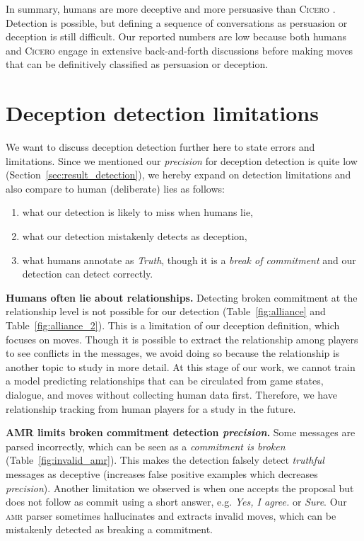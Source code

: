 \documentclass[oneside]{memoir}
\newcommand{\cicero}{\abr{Cicero} }
\newcommand{\abr}[1]{\textsc{#1}}
\begin{document}
In summary, humans are more deceptive and more persuasive than \cicero{}. 
%
Detection is possible, but defining a sequence of conversations as persuasion or deception is still difficult. 
%
Our reported numbers are low because both humans and \cicero{} engage in extensive back-and-forth discussions before making moves that can be definitively classified as persuasion or deception.


\section{Deception detection limitations}
\label{sec:deception_limitation}
We want to discuss deception detection further here to state errors and limitations. Since we mentioned our \textit{precision} for deception detection is quite low (Section~\ref{sec:result_detection}), we hereby expand on detection limitations and also compare to human (deliberate) lies as follows:
\begin{enumerate}
    \item what our detection is likely to miss when humans lie,
    \item what our detection mistakenly detects as deception,
    \item what humans annotate as \textit{Truth}, though it is a \textit{break of commitment} and our detection can detect correctly.
\end{enumerate}
%

\textbf{Humans often lie about relationships.} Detecting broken commitment at the relationship level is not possible for our detection (Table~\ref{fig:alliance} and Table~\ref{fig:alliance_2}).
%
This is a limitation of our deception definition, which focuses on moves.
%
Though it is possible to extract the relationship among players to see conflicts in the messages, we avoid doing so because the relationship is another topic to study in more detail.
%
At this stage of our work, we cannot train a model predicting relationships that can be circulated from game states, dialogue, and moves without collecting human data first.
%
Therefore, we have relationship tracking from human players for a study in the future.

\textbf{AMR limits broken commitment detection \textit{precision}.} Some messages are parsed incorrectly, which can be seen as a \textit{commitment is broken} (Table~\ref{fig:invalid_amr}). 
%
This makes the detection falsely detect \textit{truthful} messages as deceptive (increases false positive examples which decreases \textit{precision}).
%
Another limitation we observed is when one accepts the proposal but does not follow as commit using a short answer, e.g. \textit{Yes, I agree.} or \textit{Sure}.
%
Our \abr{amr} parser sometimes hallucinates and extracts invalid moves, which can be mistakenly detected as breaking a commitment. 
%

\end{document}
